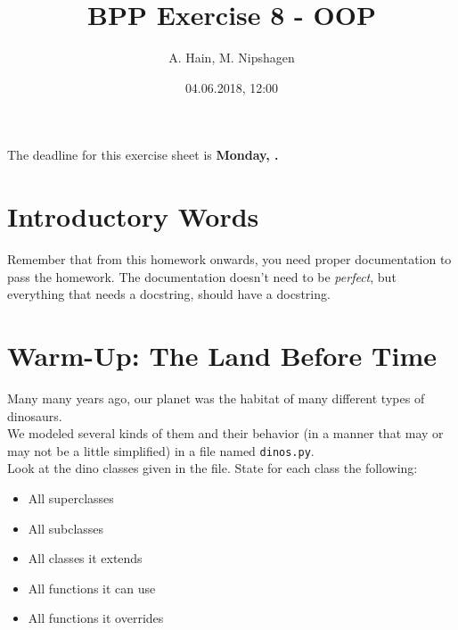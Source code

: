 
\usepackage{setspace}

\title{BPP Exercise 8 - OOP}
\author{A. Hain, M. Nipshagen}
\date{04.06.2018, 12:00}

\makeatletter
\let\thetitle\@title
\let\theauthor\@author
\let\thedate\@date
\makeatother


\newcommand\itemsub[1]{
	\begin{itemize}
		\item #1
	\end{itemize}
}





The deadline for this exercise sheet is \textbf{Monday, \thedate.}

\section*{Introductory Words}
Remember that from this homework onwards, you need proper documentation to pass
the homework. The documentation doesn't need to be \textit{perfect}, but
everything that needs a docstring, should have a docstring.


\section{Warm-Up: The Land Before Time}
Many many years ago, our planet was the habitat of many different types of dinosaurs.\\
We modeled several kinds of them and their behavior (in a manner that may or may
not be a little simplified) in a file named \texttt{dinos.py}.\\
Look at the dino classes given in the file. State for each class the following:
\begin{itemize}
	\item{All superclasses}
	\item{All subclasses}
	\item{All classes it extends}
	\item{All functions it can use}
	\item{All functions it overrides}
\end{itemize}

